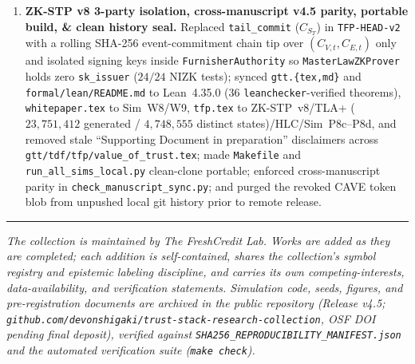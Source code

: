 \documentclass[11pt]{article}
\begin{document}
\begin{enumerate}
\item \textbf{ZK-STP v8 3-party isolation, cross-manuscript v4.5 parity, portable build, \& clean history seal.} Replaced \texttt{tail\_commit} ($C_{S_T}$) in \texttt{TFP-HEAD-v2} with a rolling SHA-256 event-commitment chain tip over $(C_{V,t}, C_{E,t})$ only and isolated signing keys inside \texttt{FurnisherAuthority} so \texttt{MasterLawZKProver} holds zero \texttt{sk\_issuer} ($24/24$ NIZK tests); synced \texttt{gtt.\{tex,md\}} and \texttt{formal/lean/README.md} to Lean~4.35.0 ($36$ \texttt{leanchecker}-verified theorems), \texttt{whitepaper.tex} to Sim~W8/W9, \texttt{tfp.tex} to ZK-STP~v8/TLA+ ($23{,}751{,}412$ generated / $4{,}748{,}555$ distinct states)/HLC/Sim~P8c--P8d, and removed stale ``Supporting Document in preparation'' disclaimers across \texttt{gtt/tdf/tfp/value\_of\_trust.tex}; made \texttt{Makefile} and \texttt{run\_all\_sims\_local.py} clean-clone portable; enforced cross-manuscript parity in \texttt{check\_manuscript\_sync.py}; and purged the revoked CAVE token blob from unpushed local git history prior to remote release.
\end{enumerate}

\vspace{1.2em}
\begin{center}\rule{0.32\textwidth}{0.4pt}\end{center}
\vspace{0.6em}

\noindent\emph{The collection is maintained by The FreshCredit Lab. Works are
added as they are completed; each addition is self-contained, shares the
collection's symbol registry and epistemic labeling discipline, and carries its
own competing-interests, data-availability, and verification statements.
Simulation code, seeds, figures, and pre-registration documents are archived in the public repository (Release v4.5; \texttt{github.com/devonshigaki/trust-stack-research-collection}, OSF DOI pending final deposit), verified against \texttt{SHA256\_REPRODUCIBILITY\_MANIFEST.json} and the automated verification suite (\texttt{make check}).}
\end{document}
